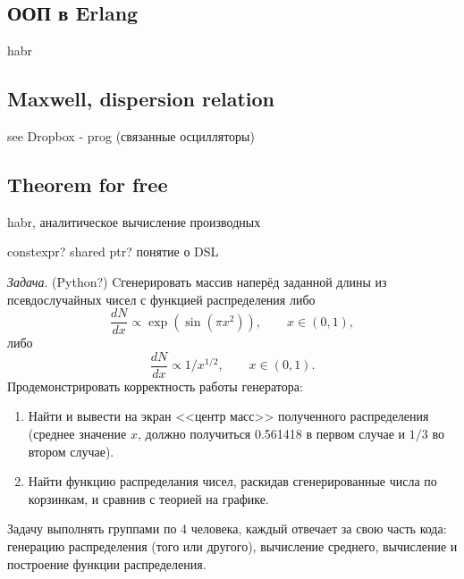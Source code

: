 \documentclass{book}
\begin{document}
\subsection{ООП в Erlang}

habr

\subsection{Maxwell, dispersion relation}

see Dropbox - prog (связанные осцилляторы)


\subsection{Theorem for free}

habr, аналитическое вычисление производных

constexpr?
shared ptr?
понятие о DSL

\textit{Задача}. (Python?) Cгенерировать массив наперёд заданной длины из псевдослучайных чисел с
функцией распределения либо
\begin{equation}
    \frac{dN}{dx} \propto \exp(\sin(\pi x^2)), \qquad x \in (0, 1),
\end{equation}
либо
\begin{equation}
    \frac{dN}{dx} \propto 1 / x^{1/2}, \qquad x \in (0, 1).
\end{equation}
Продемонстрировать корректность работы генератора:
\begin{enumerate}
  \item Найти и вывести на экран <<центр масс>> полученного распределения (среднее значение $x$,
      должно получиться 0.561418 в первом случае и $1/3$ во втором случае).
  \item Найти функцию распределания чисел, раскидав сгенерированные числа по
      корзинкам, и сравнив с теорией на графике.
\end{enumerate}
Задачу выполнять группами по 4 человека, каждый отвечает за свою часть кода: генерацию
распределения (того или другого), вычисление среднего, вычисление и построение функции
распределения.




\end{document}
